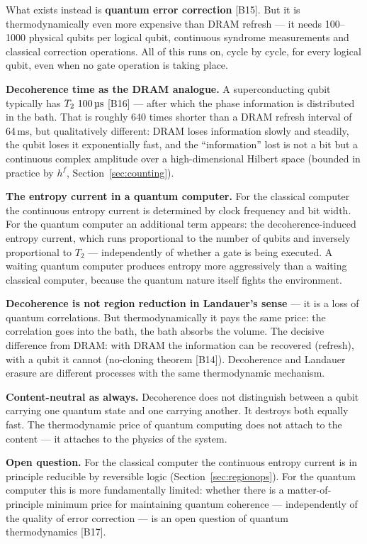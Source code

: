 What exists instead is \textbf{quantum error correction} [B15]. But it is
thermodynamically even more expensive than DRAM refresh --- it needs 100--1000
physical qubits per logical qubit, continuous syndrome measurements and classical
correction operations. All of this runs on, cycle by cycle, for every logical
qubit, even when no gate operation is taking place.

\LK \textbf{Decoherence time as the DRAM analogue.} A superconducting qubit
typically has $T_2 \sim 100\,\text{\textmu s}$ [B16] --- after which the phase
information is distributed in the bath. That is roughly 640 times shorter than a
DRAM refresh interval of 64\,ms, but qualitatively different: DRAM loses
information slowly and steadily, the qubit loses it exponentially fast, and the
“information” lost is not a bit but a continuous complex amplitude over a
high-dimensional Hilbert space (bounded in practice by $h^f$,
Section~\ref{sec:counting}).

\textbf{The entropy current in a quantum computer.} For the classical computer the
continuous entropy current is determined by clock frequency and bit width. For the
quantum computer an additional term appears: the decoherence-induced entropy
current, which runs proportional to the number of qubits and inversely
proportional to $T_2$ --- independently of whether a gate is being executed. A
waiting quantum computer produces entropy more aggressively than a waiting
classical computer, because the quantum nature itself fights the environment.

\textbf{Decoherence is not region reduction in Landauer's sense} --- it is a loss
of quantum correlations. But thermodynamically it pays the same price: the
correlation goes into the bath, the bath absorbs the volume. The decisive
difference from DRAM: with DRAM the information can be recovered (refresh), with a
qubit it cannot (no-cloning theorem [B14]). Decoherence and Landauer erasure are
different processes with the same thermodynamic mechanism.

\textbf{Content-neutral as always.} Decoherence does not distinguish between a
qubit carrying one quantum state and one carrying another. It destroys both
equally fast. The thermodynamic price of quantum computing does not attach to the
content --- it attaches to the physics of the system.

\LH \textbf{Open question.} For the classical computer the continuous entropy
current is in principle reducible by reversible logic
(Section~\ref{sec:regionops}). For the quantum computer this is more
fundamentally limited: whether there is a matter-of-principle minimum price for
maintaining quantum coherence --- independently of the quality of error correction
--- is an open question of quantum thermodynamics [B17].

